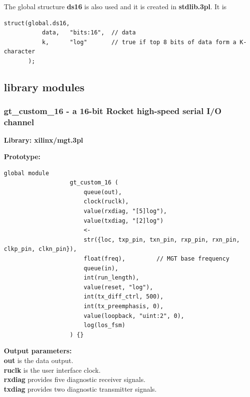     The global structure {\bf ds16} is also used and it is created in
    {\bf stdlib.3pl}. It is 
    \begin{lstlisting}[gobble=4, language=threepl]
       struct(global.ds16,
           data,   "bits:16",  // data
           k,      "log"       // true if top 8 bits of data form a K-character
       );
    \end{lstlisting}


    \subsection{library modules}

        \subsubsection{gt\_custom\_16 - a 16-bit Rocket high-speed serial I/O channel}\label{sec:lmgtcustom16}

            {\bf Library: xilinx/mgt.3pl}

            {\bf Prototype:} \\
            \vsp
            \begin{lstlisting}[gobble=12, language=threepl]
               global module
                   gt_custom_16 (
                       queue(out),
                       clock(ruclk),
                       value(rxdiag, "[5]log"),
                       value(txdiag, "[2]log")
                       <-
                       str({loc, txp_pin, txn_pin, rxp_pin, rxn_pin, clkp_pin, clkn_pin}),
                       float(freq),         // MGT base frequency
                       queue(in),
                       int(run_length),
                       value(reset, "log"),
                       int(tx_diff_ctrl, 500),
                       int(tx_preemphasis, 0),
                       value(loopback, "uint:2", 0),
                       log(los_fsm)
                   ) {}
            \end{lstlisting}

            {\bf Output parameters:} \\
            {\bf out} is the data output.\\
            {\bf ruclk} is the user interface clock.\\
            {\bf rxdiag} provides five diagnostic receiver signals.\\
            {\bf txdiag} provides two diagnostic transmitter signals.

